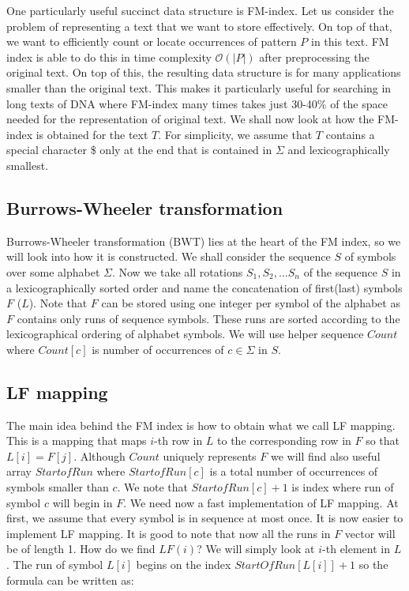 One particularly useful succinct data structure is FM-index. Let us consider the
problem of representing a text that we want to store effectively. On top of that,
we want to efficiently count or locate occurrences of pattern $P$ in this text.
FM index is able to do this in time complexity $\mathcal{O}(|P|)$ after preprocessing the
original text. On top of this, the resulting data structure is for many applications
smaller than the original text. This makes it particularly useful for searching in
long texts of DNA where FM-index many times takes just 30-40\% of the space needed
for the representation of original text. We shall now look at how the FM-index
is obtained for the text $T$. For simplicity, we assume that $T$ contains a special
character \$ only at the end that is contained in $\Sigma$ and lexicographically smallest.

\subsection{Burrows-Wheeler transformation}

Burrows-Wheeler transformation (BWT) lies at the heart of the FM index, so we will
look into how it is constructed. We shall consider the sequence $S$ of symbols over
some alphabet $\Sigma$. Now we take all rotations $S_1, S_2, \ldots S_n$ of the
sequence $S$ in a lexicographically sorted order and name the concatenation of
first(last) symbols $F$ ($L$). Note that $F$ can be stored using one integer per
symbol of the alphabet as $F$ contains only runs of sequence symbols. These runs
are sorted according to the lexicographical ordering of alphabet symbols. We will
use helper sequence $Count$ where $Count[c]$ is number of occurrences of $c\in\Sigma$ in $S$.

\subsection{LF mapping}

The main idea behind the FM index is how to obtain what we call LF mapping. This
is a mapping that maps $i$-th row in $L$ to the corresponding row in $F$ so that
$L[i] = F[j]$. Although $Count$ uniquely represents $F$ we will find also useful
array $StartofRun$ where $StartofRun[c]$ is a total number of occurrences of symbols
smaller than $c$. We note that $StartofRun[c]+1$ is index where run of symbol $c$
will begin in $F$. We need now a fast implementation of LF mapping. At first, we
assume that every symbol is in sequence at most once. It is now easier to implement
LF mapping. It is good to note that now all the runs in $F$ vector will be of length 1.
How do we find $LF(i)$? We will simply look at $i$-th element in $L$. The run of
symbol $L[i]$ begins on the index $StartOfRun[L[i]] + 1$ so the formula can be written as:

